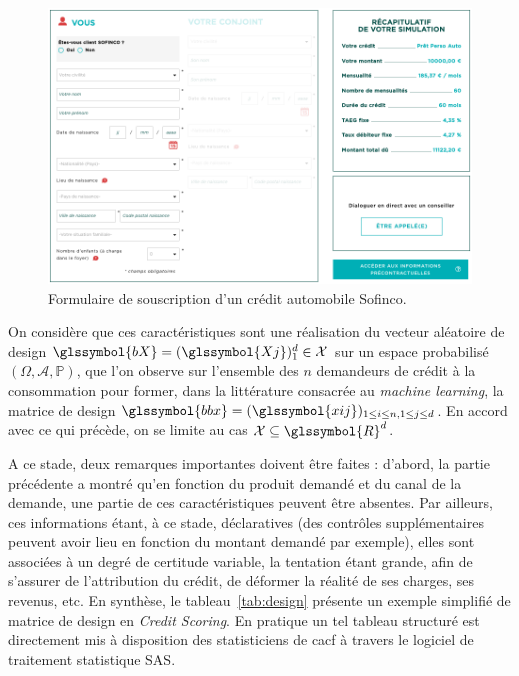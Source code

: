 \begin{figure}
\centering \includegraphics[width=15cm]{figures/chapitre1/souscription.png}
\caption{\label{fig:souscription} Formulaire de souscription d'un crédit automobile Sofinco.}
\end{figure}

On considère que ces caractéristiques sont une réalisation du vecteur aléatoire de design $\glssymbol{bX} = (\glssymbol{Xj})_1^d \in \mathcal{X}$ sur un espace probabilisé $(\Omega,\mathcal{A},\mathbb{P})$, que l'on observe sur l'ensemble des $n$ demandeurs de crédit à la consommation pour former, dans la littérature consacrée au \textit{machine learning}, la matrice de design $\glssymbol{bbx} = (\glssymbol{xij})_{1 \leq i \leq n, 1 \leq j \leq d}$. En accord avec ce qui précède, on se limite au cas $\mathcal{X} \subseteq\glssymbol{R}^d$.

A ce stade, deux remarques importantes doivent être faites : d'abord, la partie précédente a montré qu'en fonction du produit demandé et du canal de la demande, une partie de ces caractéristiques peuvent être absentes. Par ailleurs, ces informations étant, à ce stade, déclaratives (des contrôles supplémentaires peuvent avoir lieu en fonction du montant demandé par exemple), elles sont associées à un degré de certitude variable, la tentation étant grande, afin de s'assurer de l'attribution du crédit, de déformer la réalité de ses charges, ses revenus, etc. En synthèse, le tableau~\ref{tab:design} présente un exemple simplifié de matrice de design en \textit{Credit Scoring}. En pratique un tel tableau structuré est directement mis à disposition des statisticiens de \gls{cacf} à travers le logiciel de traitement statistique SAS.

